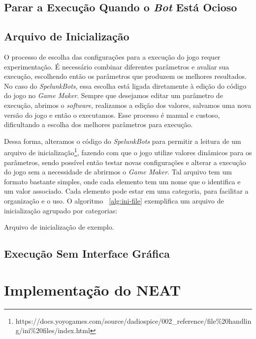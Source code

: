 \subsection{Parar a Execução Quando o \textit{Bot} Está Ocioso}

\subsection{Arquivo de Inicialização}

O processo de escolha das configurações para a execução do jogo requer
experimentação. É necessário combinar diferentes parâmetros e avaliar sua
execução, escolhendo então os parâmetros que produzem os melhores resultados.
No caso do \textit{SpelunkBots}, essa escolha está ligada diretamente à edição
do código do jogo no \textit{Game Maker}. Sempre que desejamos editar um
parâmetro de execução, abrimos o \textit{software}, realizamos a edição dos
valores, salvamos uma nova versão do jogo e então o executamos. Esse processo é
manual e custoso, dificultando a escolha dos melhores parâmetros para execução.  

Dessa forma, alteramos o código do \textit{SpelunkBots} para permitir a leitura
de um arquivo de
inicialização\footnote{https://docs.yoyogames.com/source/dadiospice/002\_reference/file\%20handling/ini\%20files/index.html},
fazendo com que o jogo utilize valores dinâmicos para os parâmetros, sendo
possível então testar novas configurações e alterar a execução do jogo sem
a necessidade de abrirmos o \textit{Game Maker}. Tal arquivo tem um formato
bastante simples, onde cada elemento tem um nome que o identifica e um
valor associado. Cada elemento pode estar em uma categoria, para facilitar
a organização e o uso. O algoritmo ~\ref{alg:ini-file} exemplifica um
arquivo de inicialização agrupado por categorias:

\begin{algorithm}[H]

\caption[Arquivo de inicialização de exemplo.]
{\label{alg:ini-file}Arquivo de inicialização de exemplo.}
\end{algorithm}

\subsection{Execução Sem Interface Gráfica}

\section{\label{section:neat-details}Implementação do NEAT}

